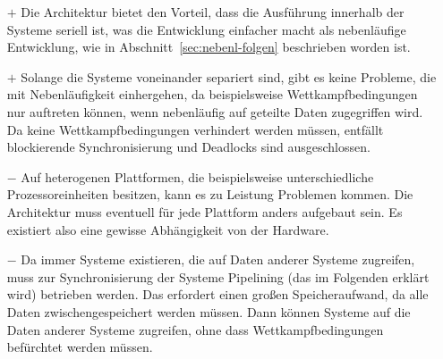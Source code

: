 \begin{itemize}
	\item[$+$] Die Architektur bietet den Vorteil, dass die Ausführung innerhalb der Systeme seriell ist, was die Entwicklung einfacher macht als nebenläufige Entwicklung, wie in Abschnitt~\ref{sec:nebenl-folgen}  beschrieben worden ist.
	\item[$+$] Solange die Systeme voneinander separiert sind, gibt es keine Probleme, die mit Nebenläufigkeit einhergehen, da beispielsweise Wettkampfbedingungen nur auftreten können, wenn nebenläufig auf geteilte Daten zugegriffen wird. Da keine Wettkampfbedingungen verhindert werden müssen, entfällt blockierende Synchronisierung und Deadlocks sind ausgeschlossen.
	\item[$-$] Auf heterogenen Plattformen, die beispielsweise unterschiedliche Prozessoreinheiten besitzen, kann es zu Leistung Problemen kommen. Die Architektur muss eventuell für jede Plattform anders aufgebaut sein. Es existiert also eine gewisse Abhängigkeit von der Hardware.
	\item[$-$] Da immer Systeme existieren, die auf Daten anderer Systeme zugreifen, muss zur Synchronisierung der Systeme Pipelining (das im Folgenden erklärt wird) betrieben werden. Das erfordert einen großen Speicheraufwand, da alle Daten zwischengespeichert werden müssen. Dann können Systeme auf die Daten anderer Systeme zugreifen, ohne dass Wettkampfbedingungen befürchtet werden müssen.
\end{itemize}

